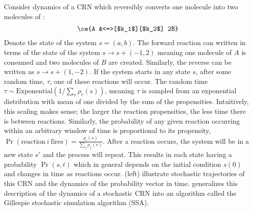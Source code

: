 Consider dynamics of a CRN which reversibly converts one molecule  into two molecules of :
\begin{align}
    \label{eq:crn:example-crn}
    \ce{A &<=>[$k_1$][$k_2$] 2B}
\end{align}
Denote the state of the system $s = (a, b)$. The forward reaction can written in terms of the state of the system $s \to s + (-1, 2)$ meaning one molecule of $A$ is consumed and two molecules of $B$ are created. Similarly, the reverse can be written as $s \to s + (1, -2)$. If the system starts in any state $s$, after some random time, $\tau$, one of these reactions will occur. The random time $\tau \sim \mathrm{Exponential}(1/\sum_r \rho_r(s))$, meaning $\tau$ is sampled from an exponential distribution with mean of one divided by the sum of the propensities. Intuitively, this scaling makes sense; the larger the reaction propensities, the less time there is between reactions. Similarly, the probability of any given reaction occurring within an arbitrary window of time is proportional to its propensity, $\Pr(\textrm{reaction}~i~\textrm{fires}) = \frac{\rho_i(s)}{\sum_j \rho_j(s)}$. After a reaction occurs, the system will be in a new state $s'$ and the process will repeat. This results in each state having a probability $\Pr(s, t)$ which in general depends on the initial condition $s(0)$ and changes in time as reactions occur.  (left) illustrate stochastic trajectories of this CRN and the dynamics of the probability vector in time.  generalizes this description of the dynamics of a stochastic CRN into an algorithm called the Gillespie stochastic simulation algorithm (SSA).


